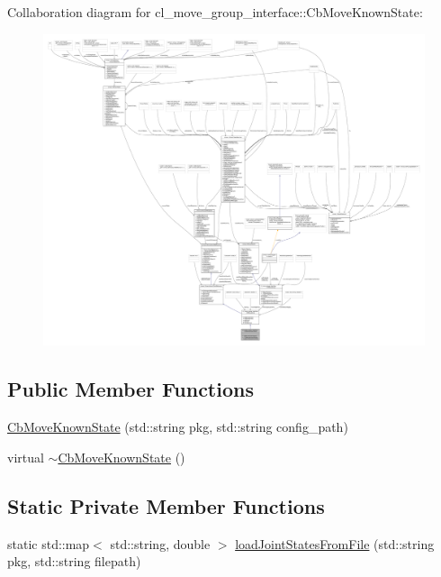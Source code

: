 Collaboration diagram for cl\+\_\+move\+\_\+group\+\_\+interface\+:\+:Cb\+Move\+Known\+State\+:
\nopagebreak
\begin{figure}[H]
\begin{center}
\leavevmode
\includegraphics[width=350pt]{classcl__move__group__interface_1_1CbMoveKnownState__coll__graph}
\end{center}
\end{figure}
\subsection*{Public Member Functions}
\begin{DoxyCompactItemize}
\item 
\hyperlink{classcl__move__group__interface_1_1CbMoveKnownState_abd9a6ff0a5aa0333852f5ea1522bc932}{Cb\+Move\+Known\+State} (std\+::string pkg, std\+::string config\+\_\+path)
\item 
virtual \hyperlink{classcl__move__group__interface_1_1CbMoveKnownState_a50cb63899a41d9e9cee7c9af3e8160d5}{$\sim$\+Cb\+Move\+Known\+State} ()
\end{DoxyCompactItemize}
\subsection*{Static Private Member Functions}
\begin{DoxyCompactItemize}
\item 
static std\+::map$<$ std\+::string, double $>$ \hyperlink{classcl__move__group__interface_1_1CbMoveKnownState_a3998d6e04560c6c4f36a3cb6f6a86780}{load\+Joint\+States\+From\+File} (std\+::string pkg, std\+::string filepath)
\end{DoxyCompactItemize}
